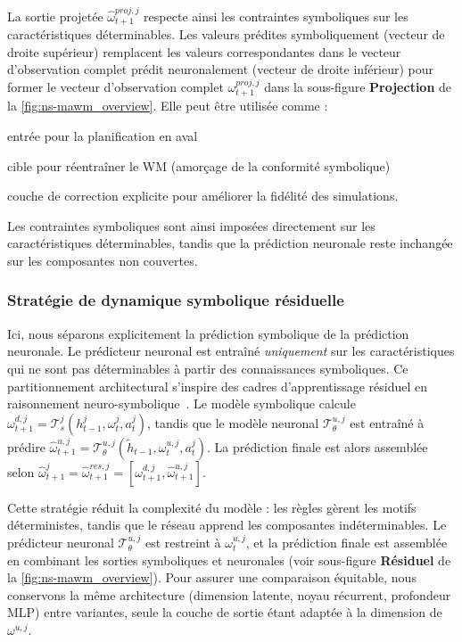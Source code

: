 \documentclass[final]{jfsma}
\theoremstyle{plain}
\theoremstyle{definition}
\theoremstyle{remark}
\begin{document}
La sortie projetée $\hat{\omega}^{proj,j}_{t+1}$ respecte ainsi les contraintes symboliques sur les caractéristiques déterminables. Les valeurs prédites symboliquement (vecteur de droite supérieur) remplacent les valeurs correspondantes dans le vecteur d'observation complet prédit neuronalement (vecteur de droite inférieur) pour former le vecteur d'observation complet $\omega^{proj,j}_{t+1}$ dans la sous-figure \textbf{Projection} de la \autoref{fig:ns-mawm_overview}. Elle peut être utilisée comme :
\begin{enumerate*}[label={\roman*) },itemjoin={; \quad}]
  \item entrée pour la planification en aval
  \item cible pour réentraîner le WM (amorçage de la conformité symbolique)
  \item couche de correction explicite pour améliorer la fidélité des simulations.
\end{enumerate*}
%
Les contraintes symboliques sont ainsi imposées directement sur les caractéristiques déterminables, tandis que la prédiction neuronale reste inchangée sur les composantes non couvertes.

\subsubsection{Stratégie de dynamique symbolique résiduelle}
\label{sec:residual_symbolic_dynamics}

Ici, nous séparons explicitement la prédiction symbolique de la prédiction neuronale. Le prédicteur neuronal est entraîné \emph{uniquement} sur les caractéristiques qui ne sont pas déterminables à partir des connaissances symboliques. Ce partitionnement architectural s'inspire des cadres d'apprentissage résiduel en raisonnement neuro-symbolique~\cite{garcez2023neurosymbolic, balloch2023neurosymbolicworldmodelsadapting}. Le modèle symbolique calcule $\omega^{d,j}_{t+1} = \mathcal{T}^j_s(h^j_{t-1}, \omega^j_t, a^j_t)$, tandis que le modèle neuronal $\mathcal{T}_{\theta}^{u,j}$ est entraîné à prédire $\hat{\omega}^{u,j}_{t+1} = \mathcal{T}_{\theta}^{u,j}(\tilde{h}_{t-1}, \omega^{u,j}_t, a^j_t)$. La prédiction finale est alors assemblée selon $\hat{\omega}^{j}_{t+1} = \hat{\omega}^{res,j}_{t+1} = [\omega^{d,j}_{t+1}, \hat{\omega}^{u,j}_{t+1}]$.

Cette stratégie réduit la complexité du modèle : les règles gèrent les motifs déterministes, tandis que le réseau apprend les composantes indéterminables. Le prédicteur neuronal $\mathcal{T}_{\theta}^{u,j}$ est restreint à $\omega^{u,j}_{t}$, et la prédiction finale est assemblée en combinant les sorties symboliques et neuronales (voir sous-figure \textbf{Résiduel} de la \autoref{fig:ns-mawm_overview}). Pour assurer une comparaison équitable, nous conservons la même architecture (dimension latente, noyau récurrent, profondeur MLP) entre variantes, seule la couche de sortie étant adaptée à la dimension de $\omega^{u,j}$.
\end{document}
